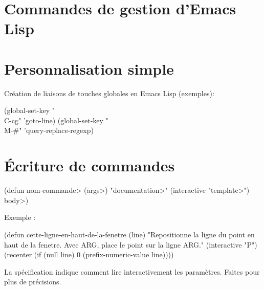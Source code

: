 \section{Commandes de gestion d'Emacs Lisp}


\section{Personnalisation simple}



Cr\'eation de liaisons de touches globales en Emacs Lisp (exemples):

\beginexample%
(global-set-key "\\C-cg" 'goto-line)
(global-set-key "\\M-\#" 'query-replace-regexp)
\endexample

\section{\'Ecriture de commandes}

\beginexample%
(defun \<nom-commande> (\<args>)
  "\<documentation>" (interactive "\<template>")
  \<body>)
\endexample

Exemple :

\beginexample%
(defun cette-ligne-en-haut-de-la-fenetre (line)
  "Repositionne la ligne du point en haut de la fenetre.
Avec ARG, place le point sur la ligne ARG."
  (interactive "P")
  (recenter (if (null line)
                0
              (prefix-numeric-value line))))
\endexample

La sp\'ecification  indique comment lire
interactivement les param\`etres. Faites  pour
plus de pr\'ecisions.

\copyrightnotice

\bye


